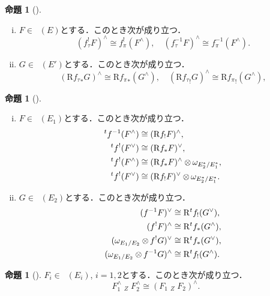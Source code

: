 \documentclass[uplatex,dvipdfmx,a4paper,10pt,draft]{jsarticle}
\theoremstyle{definition}
\newcommand{\rr}{\mathbf{R}}
\numberwithin{equation}{section}
\newcommand{\Rder}{\mathrm{R}}
\newcommand{\tens}[1][]{\mathbin{\otimes_{\raise1.5ex\hbox to-.1em{}{#1}}}}
\newcommand{\etens}{\mathbin{\boxtimes}}
\newcommand{\letens}[1][]{\mathbin{\mathop{\overset{\mathrm{L}}{\etens}}_{#1}}}
\theoremstyle{mystyle}
\newtheorem{myprp}[mythm]{命題}
\newenvironment{prp}{\begin{prpbox}\begin{myprp}}{\end{myprp}\end{prpbox}}
\newcommand{\Dlcon}{\mathop{\mathsf{D}^{+}_{\rr_{>0}}}\nolimits}
\begin{document}
\begin{prp}[{\cite[Proposition 3.7.13]{KS90}}]
    \begin{enumerate}[(i)]
        \item \(F\in\Dlcon(E)\)とする．このとき次が成り立つ．\[
            (f_\tau^!F)^\wedge\cong f_\pi^!(F^\wedge),
            \quad
            (f_\tau^{-1}F)^\wedge\cong f_\pi^{-1}(F^\wedge).
            \]
        \item \(G\in\Dlcon(E')\)とする．このとき次が成り立つ．\[
            (\Rder{f_\tau}_\ast G)^\wedge\cong \Rder{f_\pi}_\ast(G^\wedge),
            \quad
            (\Rder{f_\tau}_! G)^\wedge\cong \Rder{f_\pi}_!(G^\wedge),
            \]
    \end{enumerate}
\end{prp}

\begin{prp}[{\cite[Proposition 3.7.14]{KS90}}]
    \begin{enumerate}[(i)]
        \item \(F\in\Dlcon(E_1)\)とする．このとき次が成り立つ．
        \begin{align*}
            {}^tf^{-1}(F^\wedge)&\cong (\Rder{f}_!F)^\wedge,\\
            {}^tf^{!}(F^\vee)&\cong (\Rder{f}_\ast F)^\vee,\\
            {}^tf^{!}(F^\wedge)&\cong (\Rder{f}_{\ast}F)^\wedge\tens\omega_{E_2^\ast/E_1^\ast},\\
            {}^tf^{!}(F^\vee)&\cong (\Rder{f}_{!}F)^\vee\tens\omega_{E_2^\ast/E_1^\ast}.
        \end{align*}
        \item \(G\in\Dlcon(E_2)\)とする．このとき次が成り立つ．
        \begin{align*}
            (f^{-1}F)^\vee&\cong \Rder^t{f}_!(G^\vee),\\
            (f^{!}F)^\wedge&\cong \Rder^t{f}_\ast(G^\wedge),\\
            (\omega_{E_1/E_2}\tens f^!G)^\vee&\cong \Rder^t{f}_\ast(G^\vee),\\
            (\omega_{E_1/E_2}\tens f^{-1}G)^\wedge&\cong \Rder^t{f}_!(G^\wedge).
        \end{align*}
    \end{enumerate}
\end{prp}

\begin{prp}[{\cite[Proposition 3.7.15]{KS90}}]
    \(F_i\in\Dlcon(E_i)\), \(i=1,2\)とする．このとき次が成り立つ．
    \[
        F_1^\wedge\letens[Z]F_2^\wedge
        \cong
        \left(F_1\letens[Z]F_2\right)^\wedge.
    \]
\end{prp}
\end{document}
